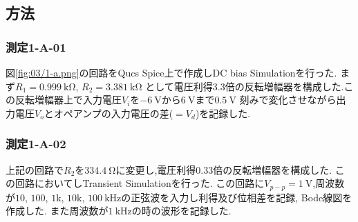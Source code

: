 \subsection{方法}
\subsubsection{測定1-A-01}
図\ref{fig:03/1-a.png}の回路をQucs Spice上で作成しDC bias Simulationを行った.
まず$R_1=0.999\ \si{\kilo\ohm}$, $R_2=3.381\ \si{\kilo\ohm}$
として電圧利得3.3倍の反転増幅器を構成した.この反転増幅器上で入力電圧$V_i$を$-6\ \si{\volt}$から$6\ \si{\volt}$まで$0.5\ \si{\volt}$
刻みで変化させながら出力電圧$V_o$とオペアンプの入力電圧の差($=V_d$)を記録した.
\subsubsection{測定1-A-02}
上記の回路で$R_2$を$334.4\ \si{\ohm}$に変更し,電圧利得0.33倍の反転増幅器を構成した.
この回路においてしTransient Simulationを行った.
この回路に$V_{p-p}=1\ \si{\volt}$,周波数が$10$, $100$, $1\si{\kilo}$, $10\si{\kilo}$, $100\ \si{\kilo\hertz}$の正弦波を入力し利得及び位相差を記録, Bode線図を作成した.
また周波数が$1\ \si{\kilo\hertz}$の時の波形を記録した.